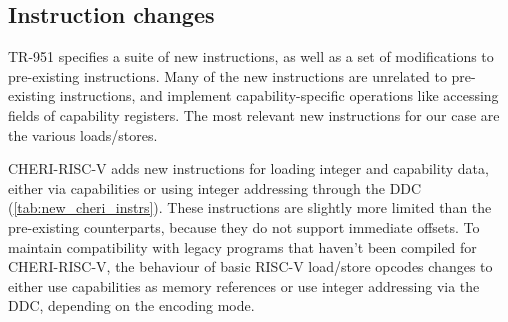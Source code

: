 \subsection{Instruction changes}
TR-951 specifies a suite of new instructions, as well as a set of modifications to pre-existing instructions.
Many of the new instructions are unrelated to pre-existing instructions, and implement capability-specific operations like accessing fields of capability registers.
The most relevant new instructions for our case are the various loads/stores.

CHERI-RISC-V adds new instructions for loading integer and capability data, either via capabilities or using integer addressing through the DDC (\cref{tab:new_cheri_instrs}).
These instructions are slightly more limited than the pre-existing counterparts, because they do not support immediate offsets. 
To maintain compatibility with legacy programs that haven't been compiled for CHERI-RISC-V, the behaviour of basic RISC-V load/store opcodes changes to either use capabilities as memory references or use integer addressing via the DDC, depending on the encoding mode.

